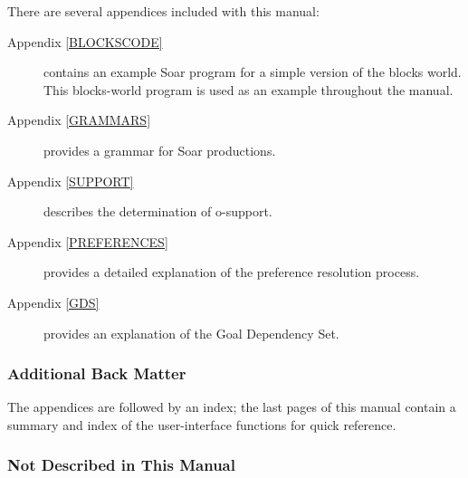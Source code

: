 There are several appendices included with this manual: 
\begin{description}


\item[Appendix \ref{BLOCKSCODE}] contains an example Soar program for a simple
version of the blocks world. This blocks-world program is used as an example
throughout the manual.



\item[Appendix \ref{GRAMMARS}] provides a grammar for Soar productions.

\item[Appendix \ref{SUPPORT}] describes the determination of o-support.

\item[Appendix \ref{PREFERENCES}] provides a detailed explanation of the preference
resolution process.


\item[Appendix \ref{GDS}] provides an explanation of the Goal Dependency Set. 
\end{description}

\subsubsection*{Additional Back Matter}

The appendices are followed by an index; the last
pages of this manual contain a summary and index of the user-interface
functions for quick reference.


\subsubsection*{Not Described in This Manual}


